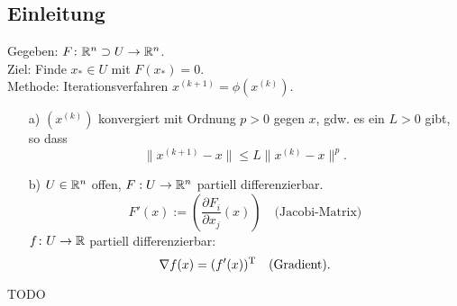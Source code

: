 \subsection{Einleitung}
Gegeben: $F\colon \mathbb R^n \supset U \to \mathbb R^n$. \\
Ziel: Finde $x_* \in U$ mit $F(x_*) = 0$. \\
Methode: Iterationsverfahren $x^{(k+1)} = \phi(x^{(k)})$.
\begin{Bemerkungen}[Erinnerungen]
\quad
\begin{itemize}
  \item[a)] $(x^{(k)})$ konvergiert mit Ordnung $p > 0$ gegen $x$,
    gdw. es ein $L > 0$ gibt, so dass $$\|x^{(k+1)} - x\| \le L\|x^{(k)} - x\|^p.$$
  \item[b)] $U \in \mathbb R^n$ offen, $F: U \to \mathbb R^n$ partiell differenzierbar.
    $$F'(x) := \left( \frac{\partial F_i}{\partial x_j}(x)\right) \quad \text{(Jacobi-Matrix)}$$
    $f\colon U \to \mathbb R$ partiell differenzierbar:
      $$\nabla f(x) = (f'(x))^\mathrm T \quad \text{(Gradient)}.$$
\end{itemize}
\end{Bemerkungen}
TODO

